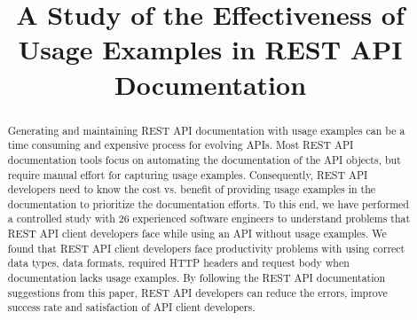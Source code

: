 \documentclass[conference]{IEEEtran}
\begin{document}
\title{A Study of the Effectiveness of Usage Examples in REST API Documentation}

\author{
}



\maketitle

\begin{abstract}
Generating and maintaining REST API documentation with usage examples can be a time consuming and expensive process for evolving APIs. Most REST API documentation tools focus on automating the documentation of the API objects, but require manual effort for capturing usage examples. Consequently, REST API developers need to know the cost vs. benefit of providing usage examples in the documentation to prioritize the documentation efforts. To this end, we have performed a controlled study with 26 experienced software engineers to understand problems that REST API client developers face while using an API without usage examples. We found that REST API client developers face productivity problems with using correct data types, data formats, required HTTP headers and request body when documentation lacks usage examples. By following the REST API documentation suggestions from this paper, REST API developers can reduce the errors, improve success rate and satisfaction of API client developers.


\end{abstract}
\end{document}
